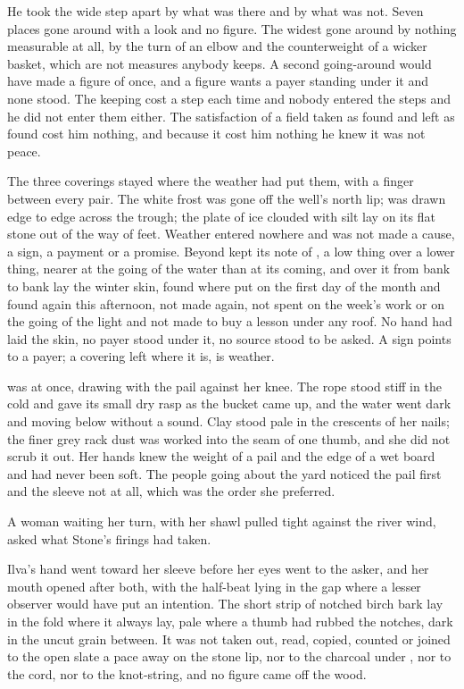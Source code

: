 He took the wide step apart by what was there and by what was not. Seven places gone around with a look and no figure. The widest gone around by nothing measurable at all, by the turn of an elbow and the counterweight of a wicker basket, which are not measures anybody keeps. A second going-around would have made a figure of once, and a figure wants a payer standing under it and none stood. The keeping cost a step each time and nobody entered the steps and he did not enter them either. The satisfaction of a field taken as found and left as found cost him nothing, and because it cost him nothing he knew it was not peace.

The three coverings stayed where the weather had put them, with a finger between every pair. The white frost was gone off the well's north lip;  was drawn edge to edge across the trough; the plate of ice clouded with silt lay on its flat stone out of the way of feet. Weather entered nowhere and was not made a cause, a sign, a payment or a promise. Beyond   kept its note of , a low thing over a lower thing, nearer at the going of the water than at its coming, and over it from bank to bank lay the winter skin, found where put on the first day of the month and found again this afternoon, not made again, not spent on the week's work or on the going of the light and not made to buy a lesson under any roof. No hand had laid the skin, no payer stood under it, no source stood to be asked. A sign points to a payer; a covering left where it is, is weather.

\scenebreak

 was at  once, drawing with the pail against her knee. The rope stood stiff in the  cold and gave its small dry rasp as the bucket came up, and the water went dark and moving below without a sound. Clay stood pale in the crescents of her nails; the finer grey rack dust was worked into the seam of one thumb, and she did not scrub it out. Her hands knew the weight of a pail and the edge of a wet board and had never been soft. The people going about the yard noticed the pail first and the sleeve not at all, which was the order she preferred.

A woman waiting her turn, with her shawl pulled tight against the river wind, asked what Stone's firings had taken.

Ilva's hand went toward her sleeve before her eyes went to the asker, and her mouth opened after both, with the half-beat lying in the gap where a lesser observer would have put an intention. The short strip of notched birch bark lay in the fold where it always lay, pale where a thumb had rubbed the notches, dark in the uncut grain between. It was not taken out, read, copied, counted or joined to the open slate a pace away on the stone lip, nor to the charcoal under , nor to the cord, nor to the knot-string, and no figure came off the wood.

